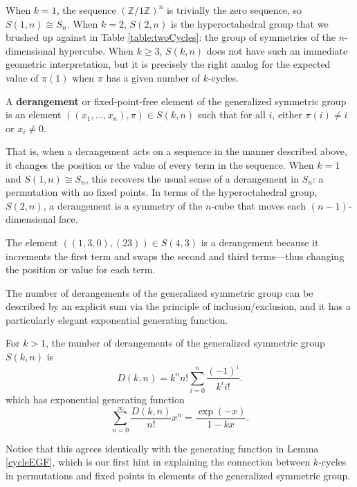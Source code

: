 When $k = 1$, the sequence $(\mathbb{Z}/1\mathbb{Z})^n$ is trivially the zero
sequence, so $S(1,n) \cong S_n$.
When $k = 2$, $S(2,n)$ is the hyperoctahedral group that we brushed up against
in Table \ref{table:twoCycles}:
the group of symmetries of the $n$-dimensional hypercube.
When $k \geq 3$, $S(k,n)$ does not have such an immediate geometric interpretation,
but it is precisely the right analog for the expected value of $\pi(1)$ when
$\pi$ has a given number of $k$-cycles.

\begin{definition}
  A \textbf{derangement} or fixed-point-free element
  of the generalized symmetric group is an element
  $((x_1,\dots,x_n),\pi) \in S(k,n)$ such that for all $i$,
  either $\pi(i) \neq i$ or $x_i \neq 0$.
\end{definition}

That is, when a derangement acts on a sequence in the manner described above,
it changes the position or the value of every term in the sequence.
When $k = 1$ and $S(1,n) \cong S_n$, this recovers the usual sense of a
derangement in $S_n$: a permutation with no fixed points.
In terms of the hyperoctahedral group, $S(2,n)$, a derangement is a symmetry of
the $n$-cube that moves each $(n-1)$-dimensional face.

\begin{example}
  The element $((1,3,0), (23)) \in S(4,3)$ is a derangement because it
  increments the first term and swaps the second and third terms---thus
  changing the position or value for each term.
\end{example}

The number of derangements of the generalized symmetric group can be described
by an explicit sum via the principle of inclusion/exclusion, and it has a
particularly elegant exponential generating function.

\begin{theorem} %
  \label{derangementEGF}
  For $k > 1$, the number of derangements of the generalized symmetric group $S(k,n)$ is
  \begin{equation}
    D(k,n) = k^n n!\sum_{i=0}^n \frac{(-1)^i}{k^i i!}.
  \end{equation} which has exponential generating function
  \begin{equation}
    \sum_{n=0}^\infty \frac{D(k,n)}{n!}x^n = \frac{\exp(-x)}{1 - kx}.
  \end{equation}
\end{theorem}
Notice that this agrees identically with the generating function in
Lemma \ref{cycleEGF}, which is our first hint in explaining the connection
between $k$-cycles in permutations and fixed points in elements of the
generalized symmetric group.
